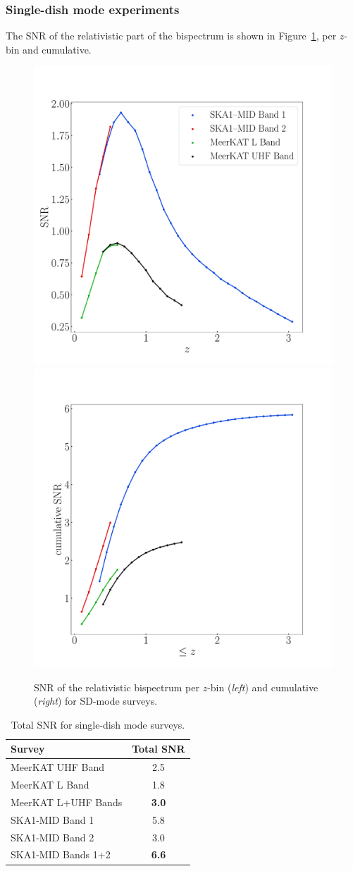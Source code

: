 \subsubsection{Single-dish mode experiments}
%
%
The SNR of the relativistic part of the bispectrum is shown in Figure~\ref{fig3}, per $z$-bin and cumulative.
\begin{figure}[!ht]
\centering
\includegraphics[width=.49\textwidth]{fig/snrSingleDishDopplerBg}
\includegraphics[width=.49\textwidth]{fig/snrSingleDishCumDopplerBg} 
\caption{SNR of the relativistic bispectrum per $z$-bin (\emph{left}) and cumulative (\emph{right}) for  SD-mode surveys.}
\label{fig3}
\end{figure}
\begin{table}[!ht]
\centering
\caption{\label{tab3} Total SNR for single-dish mode surveys.} 
\vspace*{0.2cm}
\begin{tabular}{|lc|} \hline
Survey & Total SNR \\ \hline\hline 
MeerKAT UHF Band & 2.5 \\
MeerKAT L  Band & 1.8 \\
\hline
MeerKAT L+UHF Bands & {\bfseries 3.0}  \\
\hline
SKA1-MID Band 1 & 5.8 \\
SKA1-MID Band 2 & 3.0 \\
\hline
SKA1-MID Bands 1+2 & {\bfseries 6.6} \\
\hline
\end{tabular}
\end{table} 

